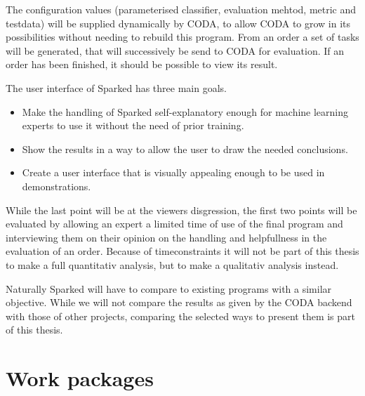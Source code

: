 \documentclass[12pt,a4paper,titlepage,oneside,BCOR1cm]{scrreprt}
\begin{document}
The configuration values (parameterised classifier, evaluation mehtod, metric and testdata) will be supplied dynamically by CODA, to allow CODA to grow in its possibilities without needing to rebuild this program.
From an order a set of tasks will be generated, that will successively be send to CODA for evaluation.
If an order has been finished, it should be possible to view its result. 

The user interface of Sparked has three main goals. 
\begin{itemize}
\item Make the handling of Sparked self-explanatory enough for machine learning experts to use it without the need of prior training. 
\item Show the results in a way to allow the user to draw the needed conclusions.
\item Create a user interface that is visually appealing enough to be used in demonstrations.
\end{itemize}

While the last point will be at the viewers disgression, the first two points will be evaluated by allowing an expert a limited time of use of the final program and interviewing them on their opinion on the handling and helpfullness in the evaluation of an order.
Because of timeconstraints it will not be part of this thesis to make a full quantitativ analysis, but to make a qualitativ analysis instead.

Naturally Sparked will have to compare to existing programs with a similar objective. 
While we will not compare the results as given by the CODA backend with those of other projects, comparing the selected ways to present them is part of this thesis.

\chapter{Work packages}
\end{document}

